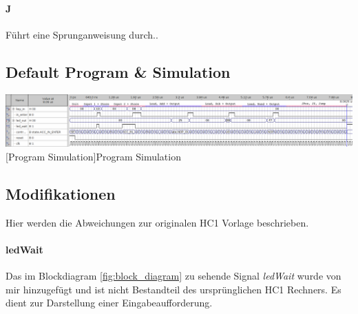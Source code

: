 \paragraph{J} Führt eine Sprunganweisung durch..

\subsection{Default Program \& Simulation}

\vspace{1em}
\begin{minipage}{\linewidth}
    \centering
    \includegraphics[width=1.0\linewidth]{images/sim.png}
    [Program Simulation]{Program Simulation}
    \label{fig:simulation}
\end{minipage}

\subsection{Modifikationen}
\label{modifications}

Hier werden die Abweichungen zur originalen HC1 Vorlage beschrieben.

\paragraph{ledWait}

Das im Blockdiagram \ref{fig:block_diagram} zu sehende Signal \emph{ledWait} wurde von mir hinzugefügt und ist nicht Bestandteil des ursprünglichen HC1 Rechners. Es dient zur Darstellung einer Eingabeaufforderung.